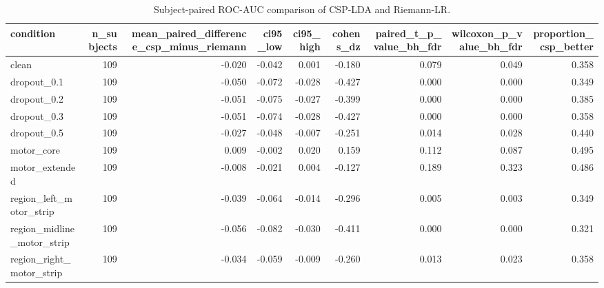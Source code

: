 \begin{table}
\caption{Subject-paired ROC-AUC comparison of CSP-LDA and Riemann-LR.}
\label{tab:pipeline-comparison}
\begin{tabular}{lrrrrrrrr}
\toprule
condition & n\_subjects & mean\_paired\_difference\_csp\_minus\_riemann & ci95\_low & ci95\_high & cohens\_dz & paired\_t\_p\_value\_bh\_fdr & wilcoxon\_p\_value\_bh\_fdr & proportion\_csp\_better \\
\midrule
clean & 109 & -0.020 & -0.042 & 0.001 & -0.180 & 0.079 & 0.049 & 0.358 \\
dropout\_0.1 & 109 & -0.050 & -0.072 & -0.028 & -0.427 & 0.000 & 0.000 & 0.349 \\
dropout\_0.2 & 109 & -0.051 & -0.075 & -0.027 & -0.399 & 0.000 & 0.000 & 0.385 \\
dropout\_0.3 & 109 & -0.051 & -0.074 & -0.028 & -0.427 & 0.000 & 0.000 & 0.358 \\
dropout\_0.5 & 109 & -0.027 & -0.048 & -0.007 & -0.251 & 0.014 & 0.028 & 0.440 \\
motor\_core & 109 & 0.009 & -0.002 & 0.020 & 0.159 & 0.112 & 0.087 & 0.495 \\
motor\_extended & 109 & -0.008 & -0.021 & 0.004 & -0.127 & 0.189 & 0.323 & 0.486 \\
region\_left\_motor\_strip & 109 & -0.039 & -0.064 & -0.014 & -0.296 & 0.005 & 0.003 & 0.349 \\
region\_midline\_motor\_strip & 109 & -0.056 & -0.082 & -0.030 & -0.411 & 0.000 & 0.000 & 0.321 \\
region\_right\_motor\_strip & 109 & -0.034 & -0.059 & -0.009 & -0.260 & 0.013 & 0.023 & 0.358 \\
\bottomrule
\end{tabular}
\end{table}

